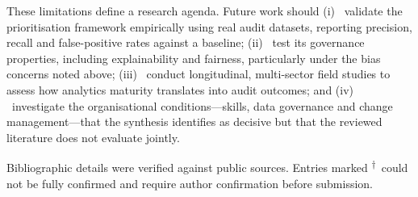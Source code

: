 \documentclass[conference]{IEEEtran}
\newcommand{\rvr}{\textsuperscript{$\dagger$}}
\begin{document}
These limitations define a research agenda. Future work should (i) ~validate the prioritisation framework empirically using real audit datasets, reporting precision, recall and false-positive rates against a baseline; (ii) ~test its governance properties, including explainability and fairness, particularly under the bias concerns noted above; (iii) ~conduct longitudinal, multi-sector field studies to assess how analytics maturity translates into audit outcomes; and (iv) ~investigate the organisational conditions---skills, data governance and change management---that the synthesis identifies as decisive but that the reviewed literature does not evaluate jointly.

\noindent Bibliographic details were verified against public sources. Entries marked \rvr\ could not be fully confirmed and require author confirmation before submission.
\end{document}
